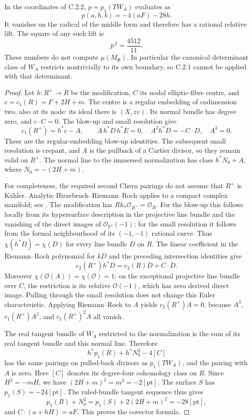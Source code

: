 \begin{proposition}
In the coordinates of C.2.2, $p=p_1(TW_A)$ evaluates as
\[
 p(a,h,b)=-4(aF)-28h.
\]
It vanishes on the radical of the middle form and therefore has a
rational relative lift. The square of any such lift is
\[
 \bar p^{\,2}=\frac{4512}{11}.
\]
These numbers do not compute $\mu(M_\Phi)$. In particular the
canonical determinant class of $W_A$ restricts nontrivially to its
own boundary, so C.2.1 cannot be applied with that determinant.
\end{proposition}
\begin{proof}
Let $h:R^+\to R$ be the modification, $C$ its nodal elliptic-fibre
centre, and $c=c_1(R)=F+2H+m$. The centre is a regular embedding of
codimension two, also at its node: its ideal there is $(X,zv)$.
Its normal bundle has degree zero, and $c\cdot C=0$. The blow-up
and small resolution give
\[
 c_1(R^+)=h^*c-A,\qquad
 A\,h^*D\,h^*E=0,\quad
 A^2h^*D=-C\cdot D,\quad A^3=0.
\]
These are the regular-embedding blow-up identities. The subsequent
small resolution is crepant, and $A$ is the pullback of a Cartier
divisor, so they remain valid on $R^+$. The normal line to the
immersed normalization has class
$h^*N_0+A$, where $N_0=-(2H+m)$.

For completeness, the required second Chern pairings do not assume
that $R^+$ is K\"ahler. Analytic Hirzebruch--Riemann--Roch applies to
a compact complex manifold; see \citet[Theorem~4.3, pp.~564--565]{AtiyahSinger1968IIIE}.
The modification has $Rh_*\mathcal O_{R^+}=\mathcal O_R$.
For the blow-up this follows locally from its hypersurface description
in the projective line bundle and the vanishing of the direct images
of $\mathcal O_{\mathbb P^1}(-1)$; for the small resolution it follows
from the formal neighbourhood of its $(-1,-1)$ rational curve.
Thus $\chi(h^*D)=\chi(D)$ for every line bundle $D$ on $R$.
The linear coefficient in the Riemann--Roch polynomial for $kD$
and the preceding intersection identities give
\[
 c_2(R^+)h^*D=c_2(R)D+C\cdot D.
\]
Moreover $\chi(\mathcal O(A))=\chi(\mathcal O)=1$: on the
exceptional projective line bundle over $C$, the restriction is its
relative $\mathcal O(-1)$, which has zero derived direct image.
Pulling through the small resolution does not change this Euler
characteristic. Applying Riemann--Roch to $A$ yields $c_2(R^+)A=0$,
because $A^3$, $c_1(R^+)A^2$, and $c_1(R^+)^2A$ all vanish.

The real tangent bundle of $W_A$ restricted to the normalization is
the sum of its real tangent bundle and this normal line. Therefore
\[
 h^*p_1(R)+h^*N_0^2-4[C]
\]
has the same pairings on pulled-back divisors as $p_1(TW_A)$, and
the pairing with $A$ is zero. Here $[C]$ denotes its degree-four
cohomology class on $R$. Since $H^2=-mH$, we have
$(2H+m)^2=m^2=-2[\mathrm{pt}]$. The surface $S$ has
$p_1(S)=-24[\mathrm{pt}]$. The ruled-bundle tangent sequence thus
gives
\[
 p_1(R)+N_0^2=p_1(S)+2(2H+m)^2=-28[\mathrm{pt}],
\]
and $C\cdot(a+hH)=aF$. This proves the covector formula.


\end{proof}
